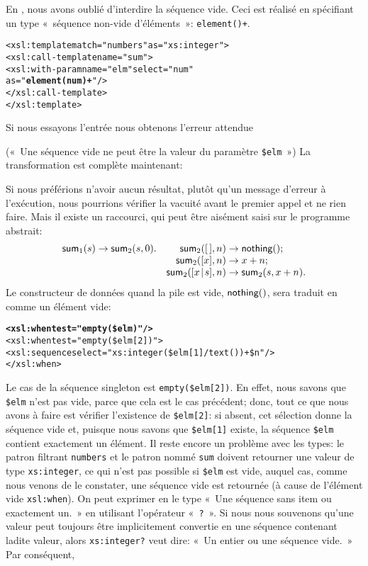 En \XSLT, nous avons oublié d'interdire la séquence vide. Ceci est
réalisé en spécifiant un type «~séquence non-vide d'éléments~»:
\texttt{element()+}.
\begin{alltt}
\small  <xsl:template match="numbers" as="xs:integer">
    <xsl:call-template name="sum">
      <xsl:with-param name="elm" select="num"
                                 as="\textbf{element(num)+}"/>
    </xsl:call-template>
  </xsl:template>
\end{alltt}
Si nous essayons l'entrée
\noindent nous obtenons l'erreur attendue
(«~Une séquence vide ne peut être la valeur du paramètre
\texttt{\$elm}~») La transformation est complète maintenant:

Si nous préférions n'avoir aucun résultat, plutôt qu'un message
d'erreur à l'exécution, nous pourrions vérifier la vacuité avant le
premier appel et ne rien faire. Mais il existe un raccourci, qui peut
être aisément saisi sur le programme abstrait:
\begin{equation*}
\begin{array}{@{}r@{\;}l@{\;}lr@{\;}l@{\;}l@{}}
\fun{sum}_1(s) & \rightarrow & \fun{sum}_2(s,0). &
    \fun{sum}_2(\el,n) & \rightarrow & \fun{nothing}();\\
&&& \fun{sum}_2([x],n) & \rightarrow & x+n;\\
&&& \fun{sum}_2(\cons{x}{s},n) & \rightarrow & \fun{sum}_2(s,x+n).
\end{array}
\end{equation*}
Le constructeur de données quand la pile est vide,
\(\textsf{nothing}()\), sera traduit en \XSLT comme un élément vide:
\begin{alltt}
\small      \textbf{<xsl:when test="empty(\$elm)"/>}
      <xsl:when test="empty(\$elm[2])">
        <xsl:sequence select="xs:integer(\$elm[1]/text()) + \$n"/>
      </xsl:when>
\end{alltt}
Le cas de la séquence singleton est \texttt{empty(\$elm[2])}. En
effet, nous savons que \texttt{\$elm} n'est pas vide, parce que cela
est le cas précédent; donc, tout ce que nous avons à faire est
vérifier l'existence de \texttt{\$elm[2]}: si absent, cet sélection
donne la séquence vide et, puisque nous savons que \texttt{\$elm[1]}
existe, la séquence \texttt{\$elm} contient exactement un élément. Il
reste encore un problème avec les types: le patron filtrant
\texttt{numbers} et le patron nommé \texttt{sum} doivent retourner une
valeur de type \texttt{xs:integer}, ce qui n'est pas possible si
\texttt{\$elm} est vide, auquel cas, comme nous venons de le
constater, une séquence vide est retournée (à cause de l'élément vide
\texttt{xsl:when}). On peut exprimer en \XPath le type «~Une séquence
sans item ou exactement un.~» en utilisant l'opérateur «~\texttt{?}~». Si
nous nous souvenons qu'une valeur peut toujours être implicitement
convertie en une séquence contenant ladite valeur, alors
\texttt{xs:integer?} veut dire: «~Un entier ou une séquence vide.~» Par
conséquent, 

